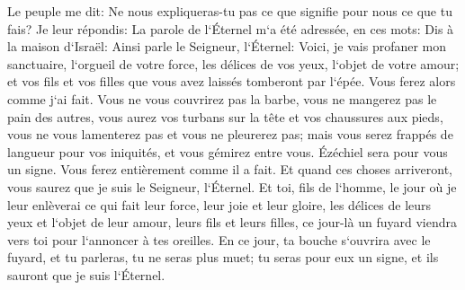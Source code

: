 \verse Le peuple me dit: Ne nous expliqueras-tu pas ce que signifie pour nous ce que tu fais? 
\verse Je leur répondis: La parole de l`Éternel m`a été adressée, en ces mots: 
\verse Dis à la maison d`Israël: Ainsi parle le Seigneur, l`Éternel: Voici, je vais profaner mon sanctuaire, l`orgueil de votre force, les délices de vos yeux, l`objet de votre amour; et vos fils et vos filles que vous avez laissés tomberont par l`épée. 
\verse Vous ferez alors comme j`ai fait. Vous ne vous couvrirez pas la barbe, vous ne mangerez pas le pain des autres, 
\verse vous aurez vos turbans sur la tête et vos chaussures aux pieds, vous ne vous lamenterez pas et vous ne pleurerez pas; mais vous serez frappés de langueur pour vos iniquités, et vous gémirez entre vous. Ézéchiel sera pour vous un signe. 
\verse Vous ferez entièrement comme il a fait. Et quand ces choses arriveront, vous saurez que je suis le Seigneur, l`Éternel. 
\verse Et toi, fils de l`homme, le jour où je leur enlèverai ce qui fait leur force, leur joie et leur gloire, les délices de leurs yeux et l`objet de leur amour, leurs fils et leurs filles, 
\verse ce jour-là un fuyard viendra vers toi pour l`annoncer à tes oreilles. 
\verse En ce jour, ta bouche s`ouvrira avec le fuyard, et tu parleras, tu ne seras plus muet; tu seras pour eux un signe, et ils sauront que je suis l`Éternel. 

\chapter{}

